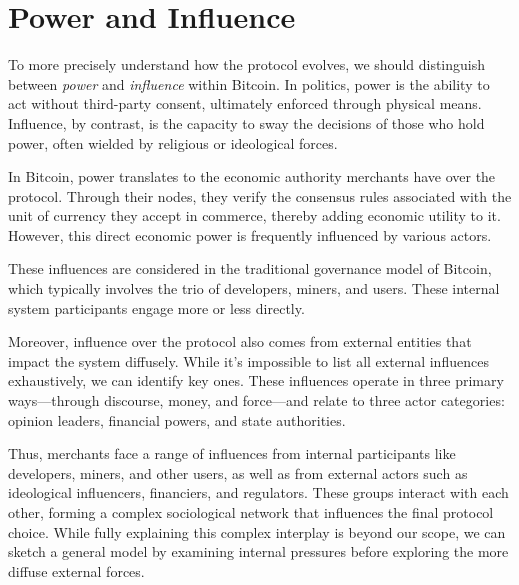 \documentclass[
  a5paper,
  smalldemyvopaper,10pt,twoside,onecolumn,openright,extrafontsizes,hidelinks]{memoir}
\begin{document}
\section*{Power and Influence}\label{power-and-influence}


To more precisely understand how the protocol evolves, we should
distinguish between \emph{power} and \emph{influence} within Bitcoin. In
politics, power is the ability to act without third-party consent,
ultimately enforced through physical means. Influence, by contrast, is
the capacity to sway the decisions of those who hold power, often
wielded by religious or ideological forces.

In Bitcoin, power translates to the economic authority merchants have
over the protocol. Through their nodes, they verify the consensus rules
associated with the unit of currency they accept in commerce, thereby
adding economic utility to it. However, this direct economic power is
frequently influenced by various actors.

These influences are considered in the traditional governance model of
Bitcoin, which typically involves the trio of developers, miners, and
users. These internal system participants engage more or less directly.

Moreover, influence over the protocol also comes from external entities
that impact the system diffusely. While it's impossible to list all
external influences exhaustively, we can identify key ones. These
influences operate in three primary ways---through discourse, money, and
force---and relate to three actor categories: opinion leaders, financial
powers, and state authorities.

Thus, merchants face a range of influences from internal participants
like developers, miners, and other users, as well as from external
actors such as ideological influencers, financiers, and regulators.
These groups interact with each other, forming a complex sociological
network that influences the final protocol choice. While fully
explaining this complex interplay is beyond our scope, we can sketch a
general model by examining internal pressures before exploring the more
diffuse external forces.
\end{document}
